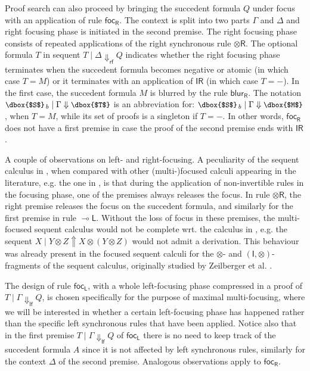 \documentclass[runningheads]{llncs}
\newcommand{\tr}{\otimes \mathsf{R}}
\newcommand{\lleft}{{\multimap}\mathsf{L}}
\newcommand{\unitr}{\mathsf{IR}}
\newcommand{\otR}{\tr}
\newcommand{\lolliL}{\lleft}
\newcommand{\IR}{\unitr}
\newcommand{\ot}{\otimes}
\newcommand{\I}{\mathsf{I}}
\newcommand{\lf}{\dn_\mathsf{lf}}%
\newcommand{\rf}{\dn_\mathsf{rf}}%
\newcommand{\up}{\Uparrow}
\newcommand{\dn}{\Downarrow}
\newcommand{\focL}{\mathsf{foc_L}}
\newcommand{\focR}{\mathsf{foc_R}}
\newcommand{\blurR}{\mathsf{blur_R}}
\begin{document}
Proof search can also proceed by bringing the succedent formula $Q$ under focus with an application of rule $\focR$. The context is split into two parts $\Gamma$ and $\Delta$ and right focusing phase is initiated in the second premise. The right focusing phase consists of repeated applications of the right synchronous rule $\otR$. The optional formula $T$ in sequent $T \mid \Delta \rf Q$ indicates whether the right focusing phase terminates when the succedent formula becomes negative or atomic (in which case $T = M$) or it terminates with an application of $\IR$ (in which case $T = -$). In the first case, the succedent formula $M$ is blurred by the rule $\blurR$. The notation $\small\dbox{$S$}_{\, b} \mid \Gamma \dn \dbox{$T$}$ is an abbreviation for: $\small\dbox{$S$}_{\, b} \mid \Gamma \dn \dbox{$M$}$, when $T = M$, while its set of proofs is a singleton if $T = -$. In other words, $\focR$ does not have a first premise in case the proof of the second premise ends with $\IR$.

A couple of observations on left- and right-focusing.
A peculiarity of the sequent calculus in , when compared with other (multi-)focused calculi appearing in the literature, e.g. the one in \cite{chaudhuri:canonical:2008}, is that during the application of non-invertible rules in the focusing phase, one of the premises always releases the focus. In rule $\otR$, the right premise releases the focus on the succedent formula, and similarly for the  first premise in rule $\lolliL$. Without the loss of focus in these premises, the multi-focused sequent calculus would not be complete wrt. the calculus in , e.g. the sequent $X \mid Y  \ot Z \up X \ot (Y \ot Z)$ would not admit a derivation. This behaviour was already present in the focused sequent calculi for the $\ot$- and $(\I,\ot)$-fragments of the sequent calculus, originally studied by Zeilberger et al. \cite{zeilberger:semiassociative:19,uustalu:sequent:2021}.

The design of rule $\focL$, with a whole left-focusing phase compressed in a proof of $T \mid \Gamma \lf Q$, is chosen specifically for the purpose of maximal multi-focusing, where we will be interested in whether a certain left-focusing phase has happened rather than the specific left synchronous rules that have been applied. Notice also that in the first premise $T \mid \Gamma \lf Q$ of $\focL$ there is no need to keep track of the succedent formula $A$ since it is not affected by left synchronous rules, similarly for the context $\Delta$ of the second premise. Analogous observations apply to $\focR$.
\end{document}
